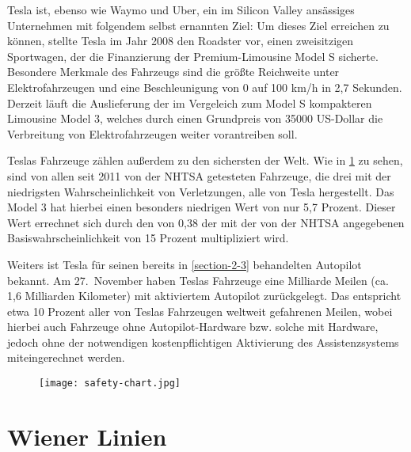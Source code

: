 Tesla ist, ebenso wie Waymo und Uber, ein im Silicon Valley ansässiges Unternehmen mit folgendem selbst ernannten Ziel:  Um dieses Ziel erreichen zu können, stellte Tesla im Jahr 2008 den Roadster vor, einen zweisitzigen Sportwagen, der die Finanzierung der Premium-Limousine Model S sicherte. Besondere Merkmale des Fahrzeugs sind die größte Reichweite unter Elektrofahrzeugen und eine Beschleunigung von 0 auf 100 \si[per-mode=symbol]{\kilo\metre\per\hour} in 2,7 Sekunden. Derzeit läuft die Auslieferung der im Vergeleich zum Model S kompakteren Limousine Model 3, welches durch einen Grundpreis von \num{35000} US-Dollar die Verbreitung von Elektrofahrzeugen weiter vorantreiben soll.

Teslas Fahrzeuge zählen außerdem zu den sichersten der Welt. Wie in \ref{safety-chart} zu sehen, sind von allen seit 2011 von der \ac{NHTSA} getesteten Fahrzeuge, die drei mit der niedrigsten Wahrscheinlichkeit von Verletzungen, alle von Tesla hergestellt. Das Model 3 hat hierbei einen besonders niedrigen Wert von nur 5,7 Prozent. Dieser Wert errechnet sich durch den  von 0,38 der mit der von der \ac{NHTSA} angegebenen Basiswahrscheinlichkeit von 15 Prozent multipliziert wird. 

Weiters ist Tesla für seinen bereits in \ref{section-2-3} behandelten Autopilot bekannt. Am 27.\ November haben Teslas Fahrzeuge eine Milliarde Meilen (ca. 1,6 Milliarden Kilometer) mit aktiviertem Autopilot zurückgelegt. Das entspricht etwa 10 Prozent aller von Teslas Fahrzeugen weltweit gefahrenen Meilen, wobei hierbei auch Fahrzeuge ohne Autopilot-Hardware bzw. solche mit Hardware, jedoch ohne der notwendigen kostenpflichtigen Aktivierung des Assistenzsystems miteingerechnet werden. 

\begin{figure}\centering
  \texttt{[image: safety-chart.jpg]}
  \label{safety-chart}
\end{figure}

\section{Wiener Linien}


